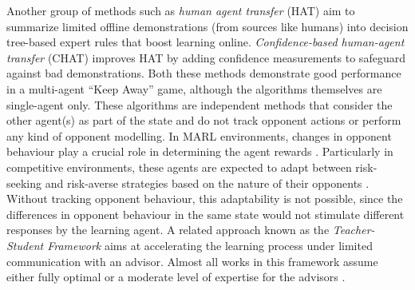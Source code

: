 \documentclass[jair, twoside,11pt,theapa]{article}
\begin{document}
Another group of methods such as \emph{human agent transfer} (HAT) \citep{taylor2011integrating} aim to summarize limited offline demonstrations (from sources like humans) into decision tree-based expert rules that boost learning online. \emph{Confidence-based human-agent transfer} (CHAT) \citep{wang2017improving} improves HAT by adding confidence measurements to safeguard against bad demonstrations. 
Both these methods demonstrate good performance in a multi-agent ``Keep Away'' game, although the algorithms themselves are single-agent only. These algorithms are independent methods that consider the other agent(s) as part of the state and do not track opponent actions or perform any kind of opponent modelling. In MARL environments, changes in opponent behaviour play a crucial role in determining the agent rewards \citep{shoham2008multiagent}. Particularly in competitive environments, these agents are expected to adapt between risk-seeking and risk-averse strategies based on the nature of their opponents \citep{conitzer2007awesome}. Without tracking opponent behaviour, this adaptability is not possible, since the differences in opponent behaviour in the same state would not stimulate different responses by the learning agent. A related approach known as the \emph{Teacher-Student Framework} \citep{Torrey2013Teaching} aims at accelerating the learning process under limited communication with an advisor. Almost all works in this framework assume either fully optimal or a moderate level of expertise for the advisors  \citep{Amir2016Interactive, Zhan2016Thoeretical}.   
\end{document}
